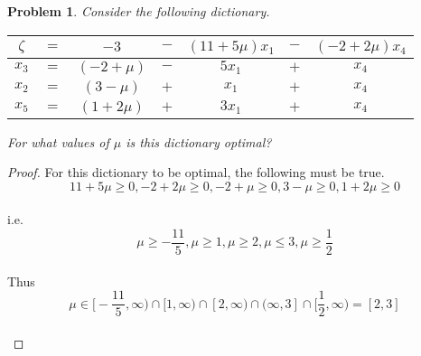 \documentclass[12pt,oneside]{amsart}
\numberwithin{equation}{section}
\numberwithin{figure}{section}
\theoremstyle{plain}
\newtheorem{prob}{Problem}
\theoremstyle{definition}
\begin{document}
\begin{prob}
Consider the following dictionary. \\
\begin{center}\begin{tabular}{|ccccccc|}
\hline
$\zeta$ & $=$ & $-3$         & $-$ & $(11 + 5\mu)x_1$ & $-$ & $(-2 + 2\mu)x_4$ \\
\hline
$x_3$   & $=$ & $(-2 + \mu)$ & $-$ & $5x_1$           & $+$ & $x_4$            \\
$x_2$   & $=$ & $(3 - \mu)$  & $+$ & $x_1$            & $+$ & $x_4$            \\
$x_5$   & $=$ & $(1 + 2\mu)$ & $+$ & $3x_1$           & $+$ & $x_4$            \\
\hline
\end{tabular}\end{center}
For what values of $\mu$ is this dictionary optimal? \\
\end{prob}
\begin{proof}
For this dictionary to be optimal, the following must be true. \\
\[11 + 5\mu \geq 0, -2 + 2\mu \geq 0, -2 + \mu \geq 0, 3 - \mu \geq 0, 1 + 2\mu \geq 0\] \\
i.e. \\
\[\mu \geq -\frac{11}{5}, \mu \geq 1, \mu \geq 2, \mu \leq 3, \mu \geq \frac{1}{2}\] \\
Thus \\
\[\mu \in \bigg[-\frac{11}{5},\infty\bigg) \cap [1,\infty) \cap [2,\infty) \cap 
(\infty,3] \cap \bigg[\frac{1}{2},\infty\bigg) = [2,3]\] \\
\end{proof}
\end{document}
